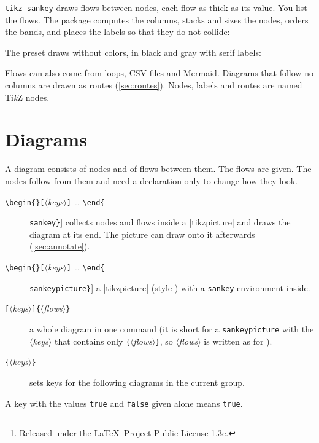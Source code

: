 \documentclass[10pt,parskip=half,english,numbers=noenddot,footnotes=nomultiple,oneside]{scrartcl}
\title{\T{tikz-sankey}}
\subtitle{\small\skrepo}
\author{Florian Sihler\thanks{Released under the \href{https://www.latex-project.org/lppl.txt}{\LaTeX\ Project Public License 1.3c}.}}
\date{Version \skdocversion{} \textendash{} \skdocdate}
\let\T\texttt
\newcommand\meta[1]{\ensuremath{\langle}\textit{#1}\ensuremath{\rangle}}
\newcommand\marg[1]{\T{\{}\meta{#1}\T{\}}}
\newcommand\oarg[1]{\T{[}\meta{#1}\T{]}}
\newcommand\envref[1]{\hyperref[env:#1]{\T{\color{skenv}#1}}}
\begin{document}
\maketitle
\thispagestyle{empty}

\noindent\T{tikz-sankey} draws flows between nodes, each flow as thick as its value. You list the flows. The package computes the columns, stacks and sizes the nodes, orders the bands, and places the labels so that they do not collide:
\begin{example}
\end{example}
The preset  draws without colors, in black and gray with serif labels:
\begin{example}
\end{example}
Flows can also come from loops, CSV files and Mermaid. Diagrams that follow no columns are drawn as routes (\cref{sec:routes}). Nodes, labels and routes are named Ti\emph{k}Z nodes.
\medskip
\setcounter{tocdepth}{\sectiontocdepth}
\tableofcontents
\bigskip

\section{Diagrams}\label{sec:diagrams}
A diagram consists of nodes and of flows between them. The flows are given. The nodes follow from them and need a declaration only to change how they look.
\begin{description}
\item[\T{\textbackslash begin\{}\T{\}}\oarg{keys} \dots{} \T{\textbackslash end\{}\envref{sankey}\T{\}}] collects nodes and flows inside a |tikzpicture| and draws the diagram at its end. The picture can draw onto it afterwards (\cref{sec:annotate}).
\item[\T{\textbackslash begin\{}\T{\}}\oarg{keys} \dots{} \T{\textbackslash end\{}\envref{sankeypicture}\T{\}}] a |tikzpicture| (style ) with a \T{sankey} environment inside.
\item[\oarg{keys}\marg{flows}] a whole diagram in one command (it is  short for a \T{sankeypicture} with the \meta{keys} that contains only \marg{flows}, so \meta{flows} is written as for ).
\item[\marg{keys}] sets keys for the following diagrams in the current group.
\end{description}
A key with the values \T{true} and \T{false} given alone means \T{true}.
\end{document}
